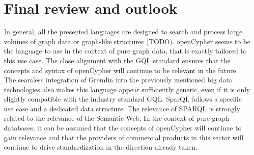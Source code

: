 \section{Final review and outlook}
In general, all the presented languages are designed to search and process large volumes 
of graph data or graph-like structures (TODO).
openCypher seems to be the language to use in the context of pure graph data, 
that is exactly tailored to this use case.
The close alignment with the GQL standard ensures that the concepts and syntax of openCypher 
will continue to be relevant in the future.
The seamless integration of Gremlin into the previously mentioned big data technologies 
also makes this language appear sufficiently generic, even if it is only slightly compatible with the 
industry standard GQL. 
SparQL follows a specific use case and a dedicated data structure. 
The relevance of SPARQL is strongly related to the relevance of the Semantic Web.
In the context of pure graph databases, it can be assumed that the concepts of openCypher 
will continue to gain relevance and that the providers of commercial products in this sector 
will continue to drive standardization in the direction already taken.







